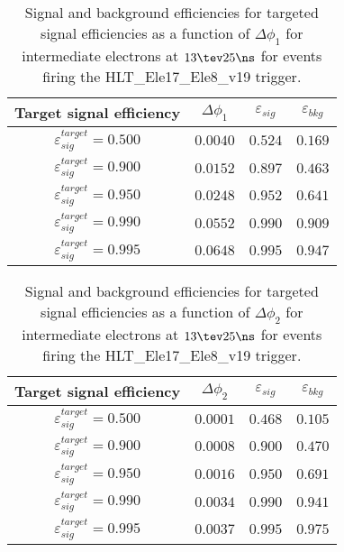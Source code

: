 \clearpage

\begin{table}[!bht]
  \begin{center}
    \begin{tabular}{cccc}
      \hline
      Target signal efficiency & $\Delta\phi_1$ & $\varepsilon_{sig}$ & $\varepsilon_{bkg}$ \\ 
      \hline
      $\varepsilon_{sig}^{target} = 0.500$ & $  0.0040$ & $0.524$ & $0.169$ \\
      $\varepsilon_{sig}^{target} = 0.900$ & $  0.0152$ & $0.897$ & $0.463$ \\
      $\varepsilon_{sig}^{target} = 0.950$ & $  0.0248$ & $0.952$ & $0.641$ \\
      $\varepsilon_{sig}^{target} = 0.990$ & $  0.0552$ & $0.990$ & $0.909$ \\
      $\varepsilon_{sig}^{target} = 0.995$ & $  0.0648$ & $0.995$ & $0.947$ \\
      \hline
    \end{tabular}
    \caption{Signal and background efficiencies for targeted signal efficiencies as a function of $\Delta\phi_1$ for intermediate electrons at $13\tev 25\ns$ for events firing the HLT\_Ele17\_Ele8\_v19 trigger.}
    \label{tab:eff_rej_phi1_beam_13_25_trigger_17_8_I}
  \end{center}
\end{table}

\clearpage

\begin{table}[!bht]
  \begin{center}
    \begin{tabular}{cccc}
      \hline
      Target signal efficiency & $\Delta\phi_2$ & $\varepsilon_{sig}$ & $\varepsilon_{bkg}$ \\ 
      \hline
      $\varepsilon_{sig}^{target} = 0.500$ & $  0.0001$ & $0.468$ & $0.105$ \\
      $\varepsilon_{sig}^{target} = 0.900$ & $  0.0008$ & $0.900$ & $0.470$ \\
      $\varepsilon_{sig}^{target} = 0.950$ & $  0.0016$ & $0.950$ & $0.691$ \\
      $\varepsilon_{sig}^{target} = 0.990$ & $  0.0034$ & $0.990$ & $0.941$ \\
      $\varepsilon_{sig}^{target} = 0.995$ & $  0.0037$ & $0.995$ & $0.975$ \\
      \hline
    \end{tabular}
    \caption{Signal and background efficiencies for targeted signal efficiencies as a function of $\Delta\phi_2$ for intermediate electrons at $13\tev 25\ns$ for events firing the HLT\_Ele17\_Ele8\_v19 trigger.}
    \label{tab:eff_rej_phi2_beam_13_25_trigger_17_8_I}
  \end{center}
\end{table}

